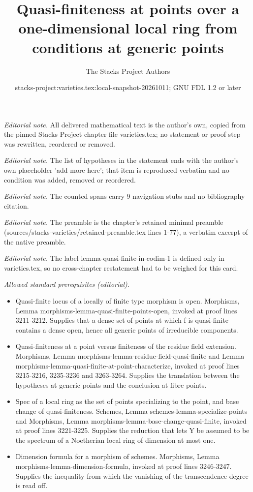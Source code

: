 \documentclass[10pt,a4paper]{amsart}
\title{Quasi-finiteness at points over a one-dimensional local ring from conditions at generic points}
\author{The Stacks Project Authors}
\date{stacks-project:varieties.tex:local-snapshot-20261011; GNU FDL 1.2 or later}
\theoremstyle{plain}
\theoremstyle{definition}
\theoremstyle{remark}
\numberwithin{equation}{subsection}
\begin{document}
\maketitle
\noindent\textit{Editorial note.} All delivered mathematical text is the author's own, copied from the pinned Stacks Project chapter file varieties.tex; no statement or proof step was rewritten, reordered or removed.\par\medskip
\noindent\textit{Editorial note.} The list of hypotheses in the statement ends with the author's own placeholder 'add more here'; that item is reproduced verbatim and no condition was added, removed or reordered.\par\medskip
\noindent\textit{Editorial note.} The counted spans carry 9 navigation stubs and no bibliography citation.\par\medskip
\noindent\textit{Editorial note.} The preamble is the chapter's retained minimal preamble (sources/stacks-varieties/retained-preamble.tex lines 1-77), a verbatim excerpt of the native preamble.\par\medskip
\noindent\textit{Editorial note.} The label lemma-quasi-finite-in-codim-1 is defined only in varieties.tex, so no cross-chapter restatement had to be weighed for this card.\par\medskip
\noindent\textit{Allowed standard prerequisites (editorial).}\begin{itemize}
\item Quasi-finite locus of a locally of finite type morphism is open. Morphisms, Lemma morphisms-lemma-quasi-finite-points-open, invoked at proof lines 3211-3212. Supplies that a dense set of points at which f is quasi-finite contains a dense open, hence all generic points of irreducible components.
\item Quasi-finiteness at a point versus finiteness of the residue field extension. Morphisms, Lemma morphisms-lemma-residue-field-quasi-finite and Lemma morphisms-lemma-quasi-finite-at-point-characterize, invoked at proof lines 3215-3216, 3235-3236 and 3263-3264. Supplies the translation between the hypotheses at generic points and the conclusion at fibre points.
\item Spec of a local ring as the set of points specializing to the point, and base change of quasi-finiteness. Schemes, Lemma schemes-lemma-specialize-points and Morphisms, Lemma morphisms-lemma-base-change-quasi-finite, invoked at proof lines 3221-3225. Supplies the reduction that lets Y be assumed to be the spectrum of a Noetherian local ring of dimension at most one.
\item Dimension formula for a morphism of schemes. Morphisms, Lemma morphisms-lemma-dimension-formula, invoked at proof lines 3246-3247. Supplies the inequality from which the vanishing of the transcendence degree is read off.
\end{itemize}\medskip
\end{document}
